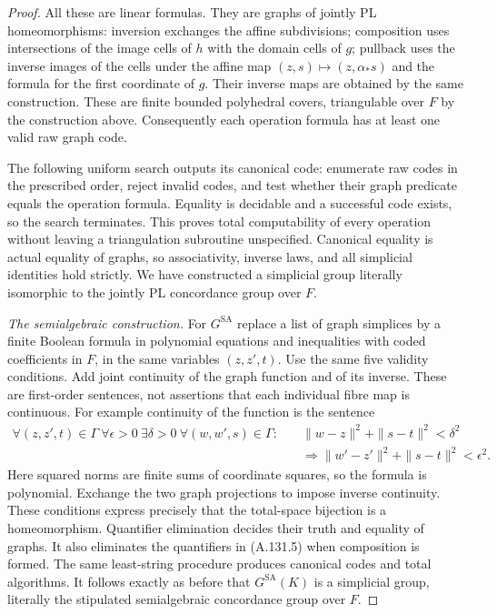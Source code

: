 \begin{proof}
All these are linear formulas. They are graphs of jointly PL
homeomorphisms: inversion exchanges the affine subdivisions;
composition uses intersections of the image cells of $h$ with the
domain cells of $g$; pullback uses the inverse images of the cells
under the affine map $(z,s)\mapsto(z,\alpha_*s)$ and the formula
for the first coordinate of $g$. Their inverse maps are obtained by
the same construction. These are finite bounded polyhedral covers,
triangulable over $F$ by the construction above. Consequently each
operation formula has at least one valid raw graph code.

The following uniform search outputs its canonical code: enumerate
raw codes in the prescribed order, reject invalid codes, and test
whether their graph predicate equals the operation formula. Equality
is decidable and a successful code exists, so the search terminates.
This proves total computability of every operation without leaving
a triangulation subroutine unspecified. Canonical equality is actual
equality of graphs, so associativity, inverse laws, and all
simplicial identities hold strictly. We have constructed a simplicial
group literally isomorphic to the jointly PL concordance group over
$F$.

\emph{The semialgebraic construction.}
For $G^{\mathrm{SA}}$ replace a list of graph simplices by a finite
Boolean formula in polynomial equations and inequalities with coded
coefficients in $F$, in the same variables $(z,z',t)$. Use the same
five validity conditions. Add joint continuity of the graph function
and of its inverse. These are first-order sentences, not assertions
that each individual fibre map is continuous. For example continuity
of the function is the sentence
\[
 \begin{split}
 \forall (z,z',t)\in\Gamma\ \forall\epsilon>0\ \exists\delta>0\
 \forall (w,w',s)\in\Gamma:
 \quad &\|w-z\|^2+\|s-t\|^2<\delta^2\\
 &\Longrightarrow
 \|w'-z'\|^2+\|s-t\|^2<\epsilon^2.
 \end{split}
                                                        \tag{A.131.7}
\]
Here squared norms are finite sums of coordinate squares, so the
formula is polynomial. Exchange the two graph projections to impose
inverse continuity. These conditions express precisely that the
total-space bijection is a homeomorphism. Quantifier elimination
decides their truth and equality of graphs. It also eliminates the
quantifiers in (A.131.5) when composition is formed. The same
least-string procedure produces canonical codes and total
algorithms. It follows exactly as before that
$G^{\mathrm{SA}}(K)$ is a simplicial group, literally the stipulated
semialgebraic concordance group over $F$.


\end{proof}
